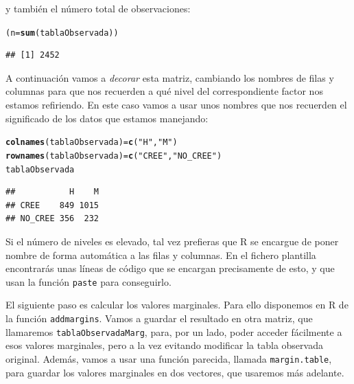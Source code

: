 \documentclass[10pt,a4paper]{article}\usepackage[]{graphicx}\usepackage[]{color}
\makeatletter
\newcommand{\hlstr}[1]{\textcolor[rgb]{0.192,0.494,0.8}{#1}}%
\newcommand{\hlstd}[1]{\textcolor[rgb]{0.345,0.345,0.345}{#1}}%
\newcommand{\hlkwb}[1]{\textcolor[rgb]{0.69,0.353,0.396}{#1}}%
\newcommand{\hlkwd}[1]{\textcolor[rgb]{0.737,0.353,0.396}{\textbf{#1}}}%
\newenvironment{kframe}{%
 \def\at@end@of@kframe{}%
 \ifinner\ifhmode%
  \def\at@end@of@kframe{\end{minipage}}%
  \begin{minipage}{\columnwidth}%
 \fi\fi%
 \def\FrameCommand##1{\hskip\@totalleftmargin \hskip-\fboxsep
 \colorbox{shadecolor}{##1}\hskip-\fboxsep
     \hskip-\linewidth \hskip-\@totalleftmargin \hskip\columnwidth}%
 \MakeFramed {\advance\hsize-\width
   \@totalleftmargin\z@ \linewidth\hsize
   \@setminipage}}%
 {\par\unskip\endMakeFramed%
 \at@end@of@kframe}
\newenvironment{knitrout}{}{} %
\newcounter {cont01}
\makeatother
\begin{document}
y también el número total de observaciones:

\begin{knitrout}
\color{fgcolor}\begin{kframe}
\begin{alltt}
\hlstd{(n} \hlkwb{=} \hlkwd{sum}\hlstd{(tablaObservada) )}
\end{alltt}
\begin{verbatim}
## [1] 2452
\end{verbatim}
\end{kframe}
\end{knitrout}

A continuación vamos a {\em decorar} esta matriz, cambiando los nombres de filas y columnas para que nos recuerden a qué nivel del correspondiente factor nos estamos refiriendo. En este caso vamos a usar unos nombres que nos recuerden el significado de los datos que estamos manejando:



\begin{knitrout}
\color{fgcolor}\begin{kframe}
\begin{alltt}
\hlkwd{colnames}\hlstd{(tablaObservada)} \hlkwb{=} \hlkwd{c}\hlstd{(}\hlstr{"H"}\hlstd{,} \hlstr{"M"}\hlstd{)}
\hlkwd{rownames}\hlstd{(tablaObservada)} \hlkwb{=} \hlkwd{c}\hlstd{(}\hlstr{"CREE"}\hlstd{,} \hlstr{"NO_CREE"} \hlstd{)}
\hlstd{tablaObservada}
\end{alltt}
\begin{verbatim}
##           H    M
## CREE    849 1015
## NO_CREE 356  232
\end{verbatim}
\end{kframe}
\end{knitrout}

Si el número de niveles es elevado, tal vez prefieras que R se encargue de poner nombre de forma automática  a las filas y columnas. En el fichero plantilla encontrarás unas líneas de código que se encargan precisamente de esto, y que usan la función {\tt paste} para conseguirlo.

El siguiente paso es calcular los valores marginales. Para ello disponemos en R de la función {\tt addmargins}. Vamos a guardar el resultado en otra matriz, que llamaremos {\tt tablaObservadaMarg}, para, por un lado, poder acceder fácilmente a esos valores marginales, pero a la vez evitando modificar la tabla observada original. Además, vamos a usar una función parecida, llamada {\tt margin.table}, para guardar los valores marginales en dos vectores, que usaremos más adelante.
\end{document}
